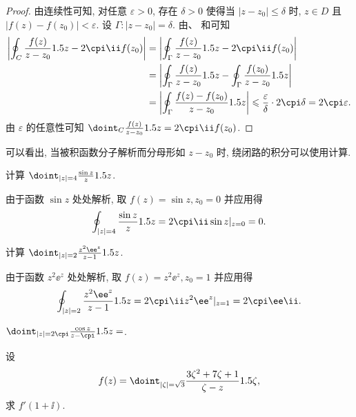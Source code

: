 \begin{proof}
  由连续性可知, 对任意 $\varepsilon>0$, 存在 $\delta>0$ 使得当 $|z-z_0|\le\delta$ 时, $z\in D$ 且 $|f(z)-f(z_0)|<\varepsilon$.
  设 $\Gamma:|z-z_0|=\delta$.
  由\thmCCC、 和\thmGrowUp 可知
  \begin{align*}
      \abs{\oint_C\frac{f(z)}{z-z_0}\d z-2\cpi\ii f(z_0)}&
    =\abs{\oint_\Gamma\frac{f(z)}{z-z_0}\d z-2\cpi\ii f(z_0)}\\&
    =\abs{\oint_\Gamma\frac{f(z)}{z-z_0}\d z-\oint_\Gamma\frac{f(z_0)}{z-z_0}\d z}\\&
    =\abs{\oint_\Gamma\frac{f(z)-f(z_0)}{z-z_0}\d z}
    \le\frac\varepsilon \delta\cdot 2\cpi \delta=2\cpi \varepsilon.
  \end{align*}
  由 $\varepsilon$ 的任意性可知 
  $\doint_C\frac{f(z)}{z-z_0}\d z=2\cpi\ii f(z_0)$.
\end{proof}

可以看出, 当被积函数分子解析而分母形如 $z-z_0$ 时, 绕闭路的积分可以使用\thmCI 计算.

\begin{example}
  计算 $\doint_{|z|=4}\frac{\sin z}z\d z$.
\end{example}

\begin{solution}
  由于函数 $\sin z$ 处处解析, 取 $f(z)=\sin z, z_0=0$ 并应用\thmCI 得
  \[
    \oint_{|z|=4} \frac{\sin z}z\d z
    =2\cpi\ii \sin z|_{z=0}
    =0.
  \]
\end{solution}

\begin{example}
  计算 $\doint_{|z|=2} \frac{z^2\ee^z}{z-1}\d z$.
\end{example}

\begin{solution}
  由于函数 $z^2\ee^z$ 处处解析, 取 $f(z)=z^2\ee^z, z_0=1$ 并应用\thmCI 得
  \[
    \oint_{|z|=2} \frac{z^2\ee^z}{z-1}\d z
    =2\cpi\ii z^2\ee^z|_{z=1}
    =2\cpi\ee\ii.
  \]
\end{solution}

\begin{exercise}
  $\doint_{|z|=2\cpi}\frac{\cos z}{z-\cpi}\d z=$\fillblank{}.
\end{exercise}

\begin{example}
  设
  \[
    f(z)=\doint_{|\zeta|=\sqrt3}\frac{3\zeta^2+7\zeta+1}{\zeta-z}\d \zeta,
  \]
  求 $f'(1+\ii)$.
\end{example}

